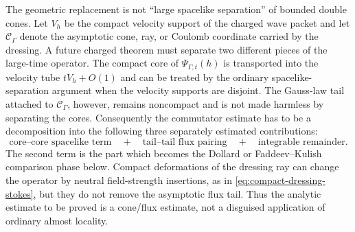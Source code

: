 The geometric replacement is not ``large spacelike separation'' of bounded
double cones.  Let \(V_h\) be the compact velocity support of the charged wave
packet and let \(\mathcal C_\Gamma\) denote the asymptotic cone, ray, or
Coulomb coordinate carried by the dressing.  A future charged theorem must
separate two different pieces of the large-time operator.  The compact core of
\(\Psi_{\Gamma,t}(h)\) is transported into the velocity tube \(tV_h+O(1)\) and
can be treated by the ordinary spacelike-separation argument when the velocity
supports are disjoint.  The Gauss-law tail attached to
\(\mathcal C_\Gamma\), however, remains noncompact and is not made harmless by
separating the cores.  Consequently the commutator estimate has to be a
decomposition into the following three separately estimated contributions:
\[
  \text{core--core spacelike term}
  \quad+\quad
  \text{tail--tail flux pairing}
  \quad+\quad
  \text{integrable remainder}.
\]
The second term is the part which becomes the Dollard or Faddeev--Kulish
comparison phase below.  Compact deformations of the dressing ray can change
the operator by neutral field-strength insertions, as in
\eqref{eq:compact-dressing-stokes}, but they do not remove the asymptotic flux
tail.  Thus the analytic estimate to be proved is a cone/flux estimate, not a
disguised application of ordinary almost locality.


